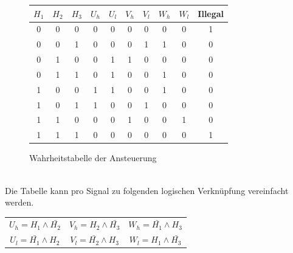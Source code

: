 \begin{figure}[h!]
\begin{tabular}{ccc||cc|cc|cc||c}
     $H_1$ & $H_2$ & $H_3$ & $U_h$ & $U_l$ & $V_h$ & $V_l$ & $W_h$ & $W_l$ & Illegal\\
\hline 0   &   0   &   0   &   0   &   0   &   0   &   0   &   0   &   0   &   1\\
       0   &   0   &   1   &   0   &   0   &   0   &   1   &   1   &   0   &   0\\
       0   &   1   &   0   &   0   &   1   &   1   &   0   &   0   &   0   &   0\\
       0   &   1   &   1   &   0   &   1   &   0   &   0   &   1   &   0   &   0\\
       1   &   0   &   0   &   1   &   1   &   0   &   0   &   1   &   0   &   0\\
       1   &   0   &   1   &   1   &   0   &   0   &   1   &   0   &   0   &   0\\
       1   &   1   &   0   &   0   &   0   &   1   &   0   &   0   &   1   &   0\\
       1   &   1   &   1   &   0   &   0   &   0   &   0   &   0   &   0   &   1\\
\end{tabular}
	\centering
	\caption{Wahrheitstabelle der Ansteuerung} 
\label{abb:WahrheitstabelleAnsteuerung}
\end{figure}\\
Die Tabelle kann pro Signal zu folgenden logischen Verknüpfung vereinfacht werden.\\
\begin{tabular}{ccc}
$U_h = H_1 \wedge \bar{H_2}$ & $V_h = H_2 \wedge \bar{H_3}$ & $W_h = \bar{H_1} \wedge H_3$\\
$U_l = \bar{H_1} \wedge H_2$ & $V_l = \bar{H_2} \wedge H_3$ & $W_l = H_1 \wedge \bar{H_3}$
\end{tabular}

 